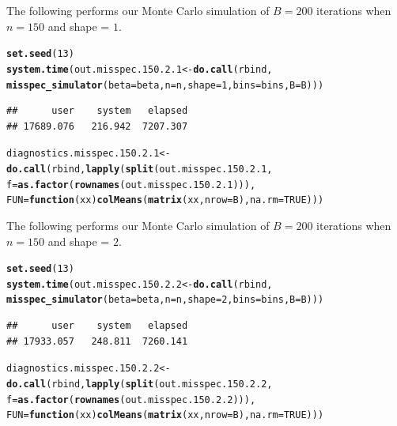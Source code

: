 \documentclass[11pt]{article}\usepackage[]{graphicx}\usepackage[]{color}
\makeatletter
\newcommand{\hlnum}[1]{\textcolor[rgb]{0.686,0.059,0.569}{#1}}%
\newcommand{\hlstd}[1]{\textcolor[rgb]{0.345,0.345,0.345}{#1}}%
\newcommand{\hlkwa}[1]{\textcolor[rgb]{0.161,0.373,0.58}{\textbf{#1}}}%
\newcommand{\hlkwb}[1]{\textcolor[rgb]{0.69,0.353,0.396}{#1}}%
\newcommand{\hlkwc}[1]{\textcolor[rgb]{0.333,0.667,0.333}{#1}}%
\newcommand{\hlkwd}[1]{\textcolor[rgb]{0.737,0.353,0.396}{\textbf{#1}}}%
\newenvironment{kframe}{%
 \def\at@end@of@kframe{}%
 \ifinner\ifhmode%
  \def\at@end@of@kframe{\end{minipage}}%
  \begin{minipage}{\columnwidth}%
 \fi\fi%
 \def\FrameCommand##1{\hskip\@totalleftmargin \hskip-\fboxsep
 \colorbox{shadecolor}{##1}\hskip-\fboxsep
     \hskip-\linewidth \hskip-\@totalleftmargin \hskip\columnwidth}%
 \MakeFramed {\advance\hsize-\width
   \@totalleftmargin\z@ \linewidth\hsize
   \@setminipage}}%
 {\par\unskip\endMakeFramed%
 \at@end@of@kframe}
\newenvironment{knitrout}{}{} %
\makeatother
\begin{document}
The following performs our Monte Carlo simulation of $B = 200$ iterations 
when $n = 150$ and shape = $1$.

\begin{knitrout}
\color{fgcolor}\begin{kframe}
\begin{alltt}
\hlkwd{set.seed}\hlstd{(}\hlnum{13}\hlstd{)}
\hlkwd{system.time}\hlstd{(out.misspec.150.2.1} \hlkwb{<-} \hlkwd{do.call}\hlstd{(rbind,}
  \hlkwd{misspec_simulator}\hlstd{(}\hlkwc{beta} \hlstd{= beta,} \hlkwc{n} \hlstd{= n,} \hlkwc{shape} \hlstd{=} \hlnum{1}\hlstd{,} \hlkwc{bins} \hlstd{= bins,} \hlkwc{B} \hlstd{= B)))}
\end{alltt}
\begin{verbatim}
##      user    system   elapsed 
## 17689.076   216.942  7207.307
\end{verbatim}
\begin{alltt}
\hlstd{diagnostics.misspec.150.2.1} \hlkwb{<-} \hlkwd{do.call}\hlstd{(rbind,} \hlkwd{lapply}\hlstd{(}\hlkwd{split}\hlstd{(out.misspec.150.2.1,}
  \hlkwc{f} \hlstd{=} \hlkwd{as.factor}\hlstd{(}\hlkwd{rownames}\hlstd{(out.misspec.150.2.1))),}
  \hlkwc{FUN} \hlstd{=} \hlkwa{function}\hlstd{(}\hlkwc{xx}\hlstd{)} \hlkwd{colMeans}\hlstd{(}\hlkwd{matrix}\hlstd{(xx,} \hlkwc{nrow} \hlstd{= B),} \hlkwc{na.rm} \hlstd{=} \hlnum{TRUE}\hlstd{)))}
\end{alltt}
\end{kframe}
\end{knitrout}


The following performs our Monte Carlo simulation of $B = 200$ iterations 
when $n = 150$ and shape = $2$.

\begin{knitrout}
\color{fgcolor}\begin{kframe}
\begin{alltt}
\hlkwd{set.seed}\hlstd{(}\hlnum{13}\hlstd{)}
\hlkwd{system.time}\hlstd{(out.misspec.150.2.2} \hlkwb{<-} \hlkwd{do.call}\hlstd{(rbind,}
  \hlkwd{misspec_simulator}\hlstd{(}\hlkwc{beta} \hlstd{= beta,} \hlkwc{n} \hlstd{= n,} \hlkwc{shape} \hlstd{=} \hlnum{2}\hlstd{,} \hlkwc{bins} \hlstd{= bins,} \hlkwc{B} \hlstd{= B)))}
\end{alltt}
\begin{verbatim}
##      user    system   elapsed 
## 17933.057   248.811  7260.141
\end{verbatim}
\begin{alltt}
\hlstd{diagnostics.misspec.150.2.2} \hlkwb{<-} \hlkwd{do.call}\hlstd{(rbind,} \hlkwd{lapply}\hlstd{(}\hlkwd{split}\hlstd{(out.misspec.150.2.2,}
  \hlkwc{f} \hlstd{=} \hlkwd{as.factor}\hlstd{(}\hlkwd{rownames}\hlstd{(out.misspec.150.2.2))),}
  \hlkwc{FUN} \hlstd{=} \hlkwa{function}\hlstd{(}\hlkwc{xx}\hlstd{)} \hlkwd{colMeans}\hlstd{(}\hlkwd{matrix}\hlstd{(xx,} \hlkwc{nrow} \hlstd{= B),} \hlkwc{na.rm} \hlstd{=} \hlnum{TRUE}\hlstd{)))}
\end{alltt}
\end{kframe}
\end{knitrout}
\end{document}
